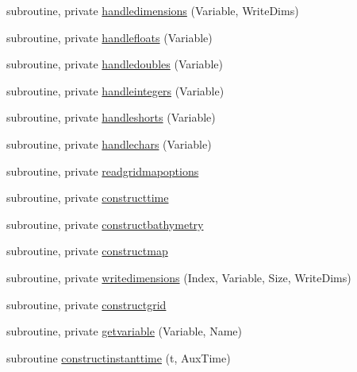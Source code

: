 \begin{DoxyCompactItemize}
subroutine, private \mbox{\hyperlink{namespacemodulewoaformat_a1755d2188a0690fff10f808cf9ecec9a}{handledimensions}} (Variable, Write\+Dims)
\item 
subroutine, private \mbox{\hyperlink{namespacemodulewoaformat_a6f71dbf9ea3807fb2646798269449c84}{handlefloats}} (Variable)
\item 
subroutine, private \mbox{\hyperlink{namespacemodulewoaformat_ad8813b60f60898f593061c4a41c50e3f}{handledoubles}} (Variable)
\item 
subroutine, private \mbox{\hyperlink{namespacemodulewoaformat_a4e5df04e6cd82c093f6173f3e08019aa}{handleintegers}} (Variable)
\item 
subroutine, private \mbox{\hyperlink{namespacemodulewoaformat_a42841ad86b89b6a226e5430c17a32293}{handleshorts}} (Variable)
\item 
subroutine, private \mbox{\hyperlink{namespacemodulewoaformat_a30b457447914696134f34e0ad5f8a6e0}{handlechars}} (Variable)
\item 
subroutine, private \mbox{\hyperlink{namespacemodulewoaformat_aa0e457259f521e3a55f034b74dd55c94}{readgridmapoptions}}
\item 
subroutine, private \mbox{\hyperlink{namespacemodulewoaformat_a99ab25469c7485e8abd999389b55602e}{constructtime}}
\item 
subroutine, private \mbox{\hyperlink{namespacemodulewoaformat_add300745a920cfd269052d32ca0ccfc7}{constructbathymetry}}
\item 
subroutine, private \mbox{\hyperlink{namespacemodulewoaformat_a5db9ab670b36026be5980f95935f64f6}{constructmap}}
\item 
subroutine, private \mbox{\hyperlink{namespacemodulewoaformat_a2416c77f949cd03e164c70c78493ad37}{writedimensions}} (Index, Variable, Size, Write\+Dims)
\item 
subroutine, private \mbox{\hyperlink{namespacemodulewoaformat_a2b1ae956746e53538872b16c62bcf308}{constructgrid}}
\item 
subroutine, private \mbox{\hyperlink{namespacemodulewoaformat_a0dce7fe9b034991dc5845a3e8ecc8cba}{getvariable}} (Variable, Name)
\item 
subroutine \mbox{\hyperlink{namespacemodulewoaformat_abe5b46fe3452046bddc33fbef20098f7}{constructinstanttime}} (t, Aux\+Time)
\end{DoxyCompactItemize}
